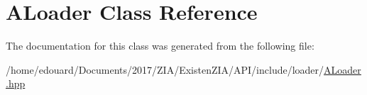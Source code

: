 \hypertarget{classALoader}{}\section{A\+Loader Class Reference}
\label{classALoader}


The documentation for this class was generated from the following file\+:\begin{DoxyCompactItemize}
\item 
/home/edouard/\+Documents/2017/\+Z\+I\+A/\+Existen\+Z\+I\+A/\+A\+P\+I/include/loader/\mbox{\hyperlink{ALoader_8hpp}{A\+Loader.\+hpp}}\end{DoxyCompactItemize}

